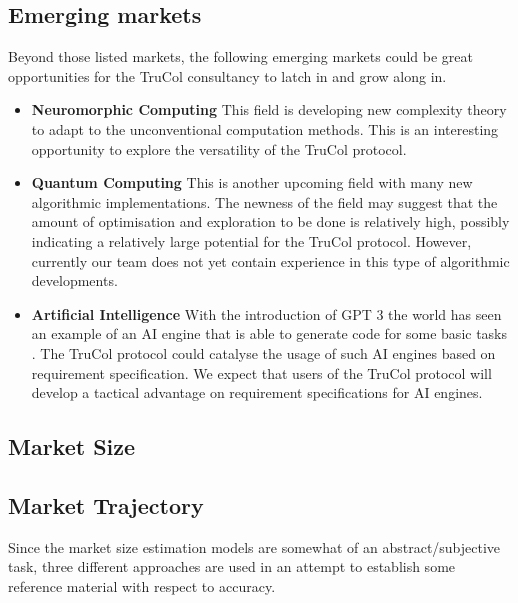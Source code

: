 \subsection{Emerging markets}
Beyond those listed markets, the following emerging markets could be great opportunities for the TruCol consultancy to latch in and grow along in.
\begin{itemize}
	\item \textbf{Neuromorphic Computing} This field is developing new complexity theory to adapt to the unconventional computation methods. This is an interesting opportunity to explore the versatility of the TruCol protocol.
	\item \textbf{Quantum Computing} This is another upcoming field with many new algorithmic implementations. The newness of the field may suggest that the amount of optimisation and exploration to be done is relatively high, possibly indicating a relatively large potential for the TruCol protocol. However, currently our team does not yet contain experience in this type of algorithmic developments.
	\item \textbf{Artificial Intelligence} With the introduction of GPT 3 the world has seen an example of an AI engine that is able to generate code for some basic tasks \cite{todo}. The TruCol protocol could catalyse the usage of such AI engines based on requirement specification. We expect that users of the TruCol protocol will develop a tactical advantage on requirement specifications for AI engines.
\end{itemize}

\subsection{Market Size}\label{subsec:model_description_market_size}
\subsection{Market Trajectory}\label{subsec:model_description_market_trajectory}

Since the market size estimation models are somewhat of an abstract/subjective task, three different approaches are used in an attempt to establish some reference material with respect to accuracy.



